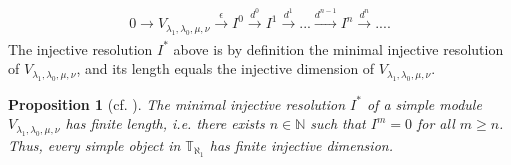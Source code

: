 \documentclass[openany, a4paper]{amsbook}
\newtheorem{prop}[thm]{Proposition}
\theoremstyle{definition}
\numberwithin{equation}{chapter}
\newcommand{\T}[1]{{\mathbb{T}}_{\aleph_{#1}}}
\DeclareMathOperator{\Hom}{\mathrm{Hom}}
\DeclareMathOperator{\im}{\mathrm{im}}
\newcommand{\Ext}[4]{\mathrm{Ext}^{#1}_{#2}({#3}, {#4})}
\begin{document}
\begin{align}\label{injective resolution}
    0 \to V_{\lambda_1, \lambda_0, \mu, \nu} \xrightarrow[]{\epsilon} I^0 \xrightarrow[]{d^0} I^1 \xrightarrow[]{d^1} ...\xrightarrow[]{d^{n-1}} I^n \xrightarrow[]{d^{n}} ... .
\end{align}
The injective resolution $I^\ast$ above is by definition the minimal injective resolution of $V_{\lambda_1, \lambda_0, \mu, \nu}$, and its length equals the injective dimension of $V_{\lambda_1, \lambda_0, \mu, \nu}$.


\begin{prop}[cf. \cite{cp17}]
    The minimal injective resolution $I^\ast$ of a simple module $V_{\lambda_1, \lambda_0, \mu, \nu}$ has finite length, i.e. there exists $n \in \mathbb{N}$ such that $I^m = 0$ for all $m \geq n$. Thus, every simple object in $\T{1}$ has finite injective dimension.
\end{prop}

\end{document}
